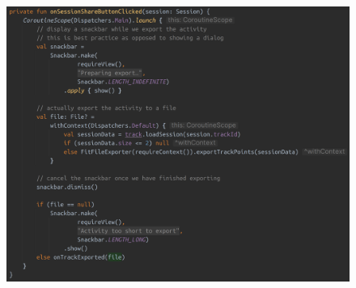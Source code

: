 \documentclass[11pt,twoside,a4paper]{report}
\begin{document}
\begin{figure}[h!]
  \centering
  \includegraphics[height=0.4\textheight]{code-onSessionShareButtonClicked.png}

\end{figure}
\end{document}
